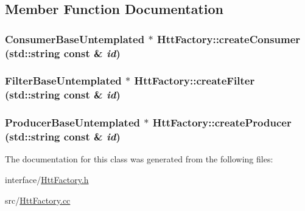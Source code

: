 \subsection{Member Function Documentation}
\hypertarget{classHttFactory_a5de496e354133732b209062e224ebf9f}{
\subsubsection[{createConsumer}]{\setlength{\rightskip}{0pt plus 5cm}ConsumerBaseUntemplated $\ast$ HttFactory::createConsumer (std::string const \& {\em id})}}
\label{classHttFactory_a5de496e354133732b209062e224ebf9f}
\hypertarget{classHttFactory_a67a1f724bd23197f6c03bb2ecee45e0a}{
\subsubsection[{createFilter}]{\setlength{\rightskip}{0pt plus 5cm}FilterBaseUntemplated $\ast$ HttFactory::createFilter (std::string const \& {\em id})}}
\label{classHttFactory_a67a1f724bd23197f6c03bb2ecee45e0a}
\hypertarget{classHttFactory_a7534ea6a4c650c35f40b6b6912383acc}{
\subsubsection[{createProducer}]{\setlength{\rightskip}{0pt plus 5cm}ProducerBaseUntemplated $\ast$ HttFactory::createProducer (std::string const \& {\em id})}}
\label{classHttFactory_a7534ea6a4c650c35f40b6b6912383acc}


The documentation for this class was generated from the following files:\begin{DoxyCompactItemize}
\item 
interface/\hyperlink{HttFactory_8h}{HttFactory.h}\item 
src/\hyperlink{HttFactory_8cc}{HttFactory.cc}\end{DoxyCompactItemize}
